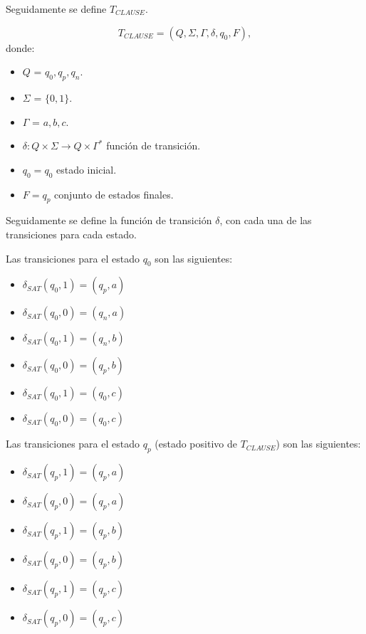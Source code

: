 Seguidamente se define $T_{CLAUSE}$.

\[
    T_{CLAUSE} = (Q, {\Sigma}, \Gamma, \delta, q_{0}, F),
\]
donde:
\begin{itemize}
    \item \(Q\) = ${q_0,q_p,q_n}$.
    \item \(\Sigma\) = $\{0,1\}$.
    \item \(\Gamma\) = ${a,b,c}$.
    \item \(\delta: Q \times \Sigma \to Q \times \Gamma^*\) función de transición.
    \item \(q_{0} = q_0\) estado inicial.
    \item \(F={q_p}\) conjunto de estados finales.
\end{itemize}

Seguidamente se define la función de transición $\delta$, con cada una de las transiciones para cada estado.

Las transiciones para el estado $q_0$ son las siguientes:
\begin{multicols}{2}
    \begin{itemize}
        \item $\delta_{SAT}(q_0,1)=(q_p,a)$
        \item $\delta_{SAT}(q_0,0)=(q_n,a)$
        \item $\delta_{SAT}(q_0,1)=(q_n,b)$
        \item $\delta_{SAT}(q_0,0)=(q_p,b)$
        \item $\delta_{SAT}(q_0,1)=(q_0,c)$
        \item $\delta_{SAT}(q_0,0)=(q_0,c)$
    \end{itemize}
\end{multicols}

Las transiciones para el estado $q_p$ (estado positivo de $T_{CLAUSE}$) son las siguientes:
\begin{multicols}{2}
    \begin{itemize}
        \item $\delta_{SAT}(q_{p},1)=(q_{p},a)$
        \item $\delta_{SAT}(q_{p},0)=(q_{p},a)$
        \item $\delta_{SAT}(q_{p},1)=(q_{p},b)$
        \item $\delta_{SAT}(q_{p},0)=(q_{p},b)$
        \item $\delta_{SAT}(q_{p},1)=(q_{p},c)$
        \item $\delta_{SAT}(q_{p},0)=(q_{p},c)$
    \end{itemize}
\end{multicols}

